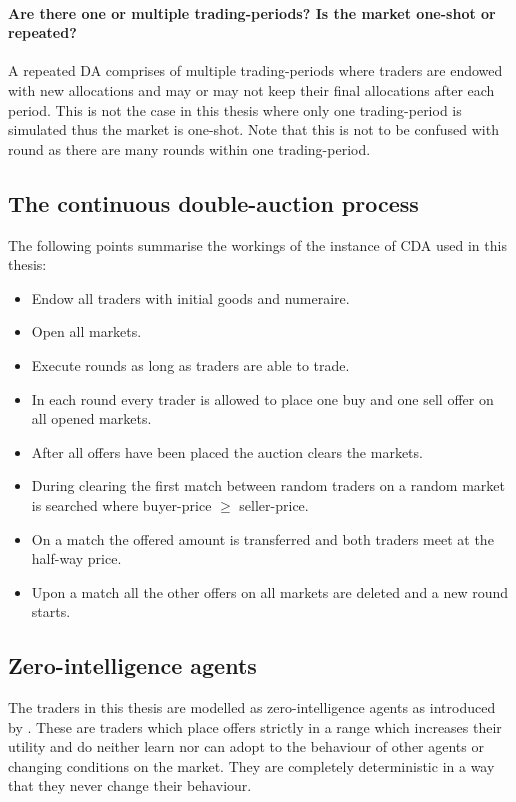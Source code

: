 \documentclass[../Bachelorarbeit.tex]{subfiles}
\begin{document}
\paragraph{Are there one or multiple trading-periods? Is the market one-shot or repeated?} A repeated DA comprises of multiple trading-periods where traders are endowed with new allocations and may or may not keep their final allocations after each period. This is not the case in this thesis where only one trading-period is simulated thus the market is one-shot. Note that this is not to be confused with \Gls{round} as there are many rounds within one trading-period.

\subsection{The continuous double-auction process}

The following points summarise the workings of the instance of CDA used in this thesis:

\begin{itemize}
\item Endow all traders with initial goods and numeraire.
\item Open all markets.
\item Execute rounds as long as traders are able to trade.
\item In each round every trader is allowed to place one buy and one sell offer on all opened markets.
\item After all offers have been placed the auction clears the markets.
\item During clearing the first match between random traders on a random market is searched where buyer-price $\geq$ seller-price.
\item On a match the offered amount is transferred and both traders meet at the half-way price.
\item Upon a match all the other offers on all markets are deleted and a new round starts.
\end{itemize}

\subsection{Zero-intelligence agents}
\label{sec:ZERO_INTELLIGENCE_AGENTS}
The traders in this thesis are modelled as zero-intelligence agents as introduced by \cite{GodeSunder1993}. These are traders which place offers strictly in a range which increases their utility and do neither learn nor can adopt to the behaviour of other agents or changing conditions on the market. They are completely deterministic in a way that they never change their behaviour. 
\end{document}

